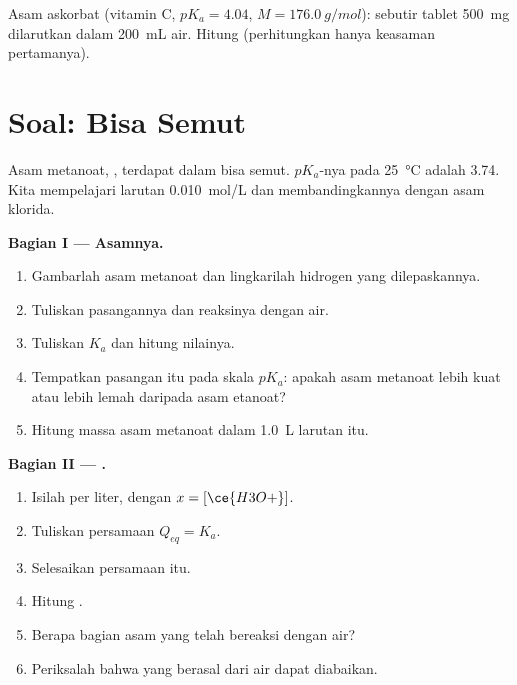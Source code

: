\begin{exercise}[$\star\star\star$]\label{exo:g12:ka-and-pka:15}
Asam askorbat (vitamin C, $pK_a = 4.04$, $M = \qty{176.0}{g/mol}$):
sebutir tablet \qty{500}{mg} dilarutkan dalam \qty{200}{mL} air. Hitung
 (perhitungkan hanya keasaman pertamanya).
\end{exercise}

\section{Soal: Bisa Semut}


\begin{problem}
\label{pb:g12:ka-and-pka:1}
Asam metanoat, , terdapat dalam bisa semut. $pK_a$-nya pada
\qty{25}{\celsius} adalah 3.74. Kita mempelajari larutan
\qty{0.010}{mol/L} dan membandingkannya dengan asam klorida.

\medskip
\noindent\textbf{Bagian I --- Asamnya.}
\begin{enumerate}
  \item Gambarlah  asam metanoat dan lingkarilah hidrogen
        yang dilepaskannya.
  \item Tuliskan pasangannya dan reaksinya dengan air.
  \item Tuliskan $K_a$ dan hitung nilainya.
  \item Tempatkan pasangan itu pada skala $pK_a$: apakah asam metanoat
        lebih kuat atau lebih lemah daripada asam etanoat?
  \item Hitung massa asam metanoat dalam \qty{1.0}{L} larutan itu.
\end{enumerate}

\medskip
\noindent\textbf{Bagian II --- .}
\begin{enumerate}[resume]
  \item Isilah  per liter, dengan $x = [\ce{H3O+}]$.
  \item Tuliskan persamaan $Q_{eq} = K_a$.
  \item Selesaikan persamaan itu.
  \item Hitung .
  \item Berapa bagian asam yang telah bereaksi dengan air?
  \item Periksalah bahwa  yang berasal dari air dapat diabaikan.
\end{enumerate}


\end{problem}
